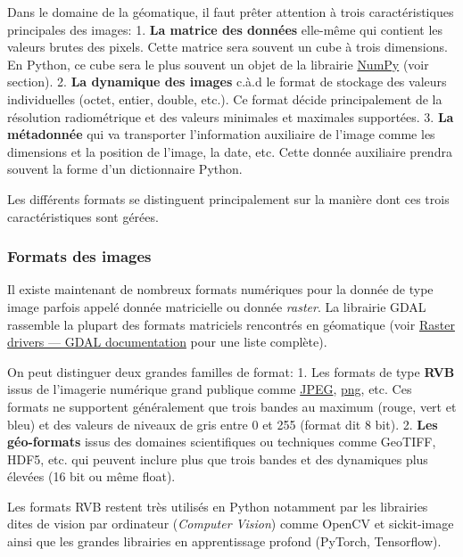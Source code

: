 \documentclass[11pt]{article}
\begin{document}
Dans le domaine de la géomatique, il faut prêter attention à trois
caractéristiques principales des images: 1. \textbf{La matrice des
données} elle-même qui contient les valeurs brutes des pixels. Cette
matrice sera souvent un cube à trois dimensions. En Python, ce cube sera
le plus souvent un objet de la librairie
\href{https://numpy.org/}{NumPy} (voir section). 2. \textbf{La dynamique
des images} c.à.d le format de stockage des valeurs individuelles
(octet, entier, double, etc.). Ce format décide principalement de la
résolution radiométrique et des valeurs minimales et maximales
supportées. 3. \textbf{La métadonnée} qui va transporter l'information
auxiliaire de l'image comme les dimensions et la position de l'image, la
date, etc. Cette donnée auxiliaire prendra souvent la forme d'un
dictionnaire Python.

Les différents formats se distinguent principalement sur la manière dont
ces trois caractéristiques sont gérées.

\hypertarget{formats-des-images}{%
\subsubsection{Formats des images}\label{formats-des-images}}

Il existe maintenant de nombreux formats numériques pour la donnée de
type image parfois appelé donnée matricielle ou donnée \emph{raster}. La
librairie GDAL rassemble la plupart des formats matriciels rencontrés en
géomatique (voir
\href{https://gdal.org/en/latest/drivers/raster/index.html}{Raster
drivers --- GDAL documentation} pour une liste complète).

On peut distinguer deux grandes familles de format: 1. Les formats de
type \textbf{RVB} issus de l'imagerie numérique grand publique comme
\href{https://gdal.org/en/latest/drivers/raster/jpeg.html\#raster-jpeg}{JPEG},
\href{https://gdal.org/en/latest/drivers/raster/png.html\#raster-png}{png},
etc. Ces formats ne supportent généralement que trois bandes au maximum
(rouge, vert et bleu) et des valeurs de niveaux de gris entre 0 et 255
(format dit 8 bit). 2. \textbf{Les géo-formats} issus des domaines
scientifiques ou techniques comme GeoTIFF, HDF5, etc. qui peuvent
inclure plus que trois bandes et des dynamiques plus élevées (16 bit ou
même float).

Les formats RVB restent très utilisés en Python notamment par les
librairies dites de vision par ordinateur (\emph{Computer Vision}) comme
OpenCV et sickit-image ainsi que les grandes librairies en apprentissage
profond (PyTorch, Tensorflow).
\end{document}
